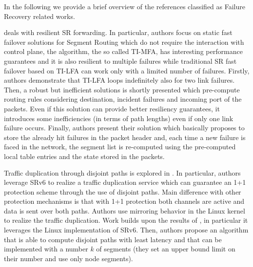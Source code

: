 In the following we provide a brief overview of the references classified as Failure Recovery related works.

\cite{timfa} deals with resilient SR forwarding. In particular, authors focus on static fast failover solutions for Segment Routing which do not require the interaction with control plane, the algorithm, the so called TI-MFA, has interesting performance guarantees and it is also resilient to multiple failures while traditional SR fast failover based on TI-LFA can work only with a limited number of failures. Firstly, authors demonstrate that TI-LFA loops indefinitely also for two link failures. Then, a robust but inefficient solutions is shortly presented which pre-compute routing rules considering destination, incident failures and incoming port of the packets. Even if this solution can provide better resiliency guarantees, it introduces some inefficiencies (in terms of path lengths) even if only one link failure occurs. Finally, authors present their solution which basically proposes to store the already hit failures in the packet header and, each time a new failure is faced in the network, the segment list is re-computed using the pre-computed local table entries and the state stored in the packets. %

Traffic duplication through disjoint paths is explored in \cite{trafficduplication}. In particular, authors leverage SRv6 to realize a traffic duplication service which can guarantee an 1+1 protection scheme through the use of disjoint paths. Main difference with other protection mechanisms is that with 1+1 protection both channels are active and data is sent over both paths. Authors use mirroring behavior in the Linux kernel to realize the traffic duplication. Work builds upon the results of \cite{srv61}, in particular it leverages the Linux implementation of SRv6. Then, authors propose an algorithm that is able to compute disjoint paths with least latency and that can be implemented with a number $k$ of segments (they set an upper bound limit on their number and use only node segments). %


